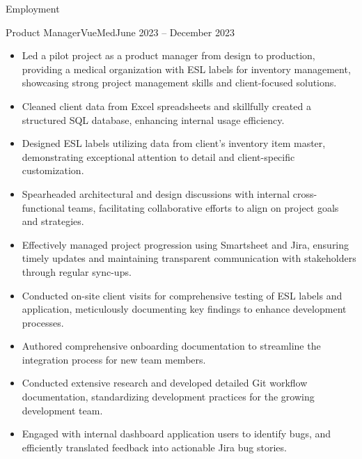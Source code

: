 \documentclass[]{mcdowellcv}
\begin{document}
	\makeheader
	
	\begin{cvsection}{Employment}
		\begin{cvsubsection}{Product Manager}{VueMed}{June 2023 -- December 2023}			
			\begin{itemize}
				\item Led a pilot project as a product manager from design to production, providing a medical organization with ESL labels for inventory management, showcasing strong project management skills and client-focused solutions.
				\item Cleaned client data from Excel spreadsheets and skillfully created a structured SQL database, enhancing internal usage efficiency. 
				\item Designed ESL labels utilizing data from client's inventory item master, demonstrating exceptional attention to detail and client-specific customization.
				\item Spearheaded architectural and design discussions with internal cross-functional teams, facilitating collaborative efforts to align on project goals and strategies.
				\item Effectively managed project progression using Smartsheet and Jira, ensuring timely updates and maintaining transparent communication with stakeholders through regular sync-ups.
				\item Conducted on-site client visits for comprehensive testing of ESL labels and application, meticulously documenting key findings to enhance development processes. 
				\item Authored comprehensive onboarding documentation to streamline the integration process for new team members.
				\item Conducted extensive research and developed detailed Git workflow documentation, standardizing development practices for the growing development team.
				\item Engaged with internal dashboard application users to identify bugs, and efficiently translated feedback into actionable Jira bug stories.
			\end{itemize}
		\end{cvsubsection}
		

\end{cvsection}
\end{document}

